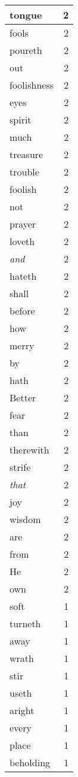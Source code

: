 \begin{center}
\begin{longtable}{l|r}
tongue & 2\\ \hline 
fools & 2\\ \hline 
poureth & 2\\ \hline 
out & 2\\ \hline 
foolishness & 2\\ \hline 
eyes & 2\\ \hline 
spirit & 2\\ \hline 
much & 2\\ \hline 
treasure & 2\\ \hline 
trouble & 2\\ \hline 
foolish & 2\\ \hline 
not & 2\\ \hline 
prayer & 2\\ \hline 
loveth & 2\\ \hline 
\emph{and} & 2\\ \hline 
hateth & 2\\ \hline 
shall & 2\\ \hline 
before & 2\\ \hline 
how & 2\\ \hline 
merry & 2\\ \hline 
by & 2\\ \hline 
hath & 2\\ \hline 
Better & 2\\ \hline 
fear & 2\\ \hline 
than & 2\\ \hline 
therewith & 2\\ \hline 
strife & 2\\ \hline 
\emph{that} & 2\\ \hline 
joy & 2\\ \hline 
wisdom & 2\\ \hline 
are & 2\\ \hline 
from & 2\\ \hline 
He & 2\\ \hline 
own & 2\\ \hline 
soft & 1\\ \hline 
turneth & 1\\ \hline 
away & 1\\ \hline 
wrath & 1\\ \hline 
stir & 1\\ \hline 
useth & 1\\ \hline 
aright & 1\\ \hline 
every & 1\\ \hline 
place & 1\\ \hline 
beholding & 1\\ \hline 

\end{longtable}
\end{center}
